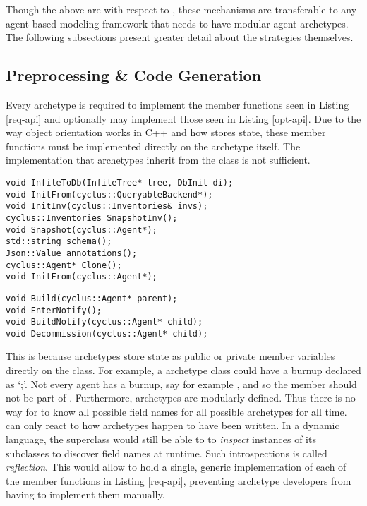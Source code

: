 Though the above are with respect to \cyclus, these mechanisms are 
transferable to any agent-based modeling framework that needs to have modular agent 
archetypes. The following subsections present greater detail about the 
strategies themselves.

\subsection{Preprocessing \& Code Generation}
\label{subsec-ppgc}

Every \cyclus archetype is required to implement the member functions 
seen in Listing \ref{req-api} and optionally may implement those seen in 
Listing \ref{opt-api}. Due to the way object orientation works in 
C++ and how \cyclus stores state, these member functions must be implemented directly
on the archetype itself. The implementation that archetypes inherit 
from the  class is not sufficient. 

\begin{lstlisting}[caption={Required Archetype API}, label=req-api]
void InfileToDb(InfileTree* tree, DbInit di);
void InitFrom(cyclus::QueryableBackend*);
void InitInv(cyclus::Inventories& invs);
cyclus::Inventories SnapshotInv();
void Snapshot(cyclus::Agent*);
std::string schema();
Json::Value annotations();
cyclus::Agent* Clone();
void InitFrom(cyclus::Agent*);
\end{lstlisting}

\begin{lstlisting}[caption={Optional Archetype API}, label=opt-api]
void Build(cyclus::Agent* parent);
void EnterNotify();
void BuildNotify(cyclus::Agent* child);
void Decommission(cyclus::Agent* child);
\end{lstlisting}

This is because archetypes store state as public or private member variables
directly on the class.  For example, a  archetype class
could have a burnup declared as `;'. Not every agent has 
a burnup, say for example , and so the  member 
should not be part of . Furthermore, archetypes are modularly 
defined. Thus there is no way for \cyclus to know all possible field names 
for all possible archetypes for all time.  \Cyclus can only react to how 
archetypes happen to have been written. In a dynamic language, the 
superclass would still be able to to \emph{inspect} instances of its subclasses
to discover field names at runtime. Such introspections is called \emph{reflection}. 
This would allow  to hold a single, generic implementation of each of the
member functions in Listing \ref{req-api}, preventing archetype developers from 
having to implement them manually.

